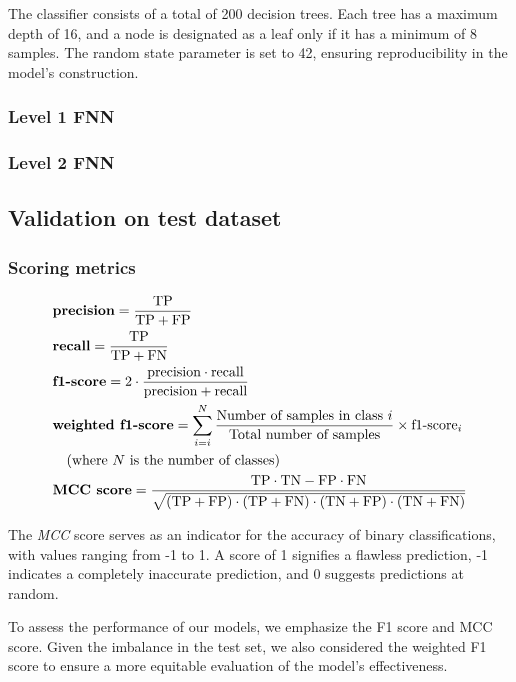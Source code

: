 \documentclass{bioinfo}
\begin{document}
\begin{methods}
The classifier consists of a total of 200 decision trees.
Each tree has a maximum depth of 16, and a node is designated as a leaf only if it has a minimum of 8 samples.
The random state parameter is set to 42, ensuring reproducibility in the model's construction.
\subsubsection{Level 1 FNN}
\subsubsection{Level 2 FNN}


\subsection{Validation on test dataset}

\subsubsection{Scoring metrics}



\begin{align}
	&\textbf{precision} = \frac{\text{TP}}{\text{TP} + \text{FP}} \\
    &\textbf{recall} = \frac{\text{TP}}{\text{TP} + \text{FN}} \\
    &\textbf{f1-score} = 2 \cdot \frac{\text{precision} \cdot \text{recall}}{\text{precision} + \text{recall}} \\
	& \textbf{weighted f1-score} = \operatornamewithlimits{\sum}^{N}_{i=i} \frac{\text{Number of samples in class }i}{\text{Total number of samples}}  \times \text{f1-score}_{i}\nonumber\\
	&\quad \text{(where $N$ is the number of classes)} \\
    &\textbf{MCC score} = \frac{\text{TP} \cdot \text{TN} - \text{FP} \cdot \text{FN}}{\sqrt{(\text{TP} + \text{FP}) \cdot (\text{TP} + \text{FN}) \cdot (\text{TN} + \text{FP}) \cdot (\text{TN} + \text{FN})}}
\end{align}

The \textit{MCC} score serves as an indicator for the accuracy of binary classifications, with values ranging from -1 to 1. A score of 1 signifies a flawless prediction, 
-1 indicates a completely inaccurate prediction, and 0 suggests predictions at random.  

To assess the performance of our models, we emphasize the F1 score and MCC score. 
Given the imbalance in the test set, we also considered the weighted F1 score to ensure a more equitable evaluation of the model's 
effectiveness.

\end{methods}
\end{document}
